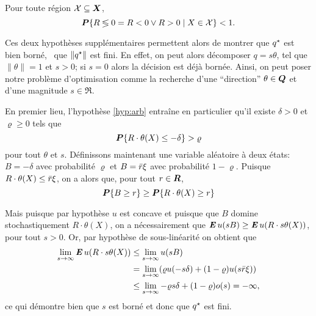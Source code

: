 \begin{assumption}
  \label{hyp:arb}
  Pour toute région $\mathcal{X}\subseteq\bm{X}$,
  \begin{equation}
    \bm P\{R \lessgtr 0 = R < 0 \vee R > 0 \mid X \in \mathcal{X}\} < 1.
  \end{equation}
\end{assumption}

Ces deux hypothèses supplémentaires permettent alors de montrer que $q^\star$ est bien borné,
\ie\ que $\|q^\star\|$ est fini. En effet, on peut alors décomposer $q = s\theta$, tel que
$\|\theta\|=1$ et $s>0$; si $s=0$ alors la décision est déjà bornée. Ainsi, on peut poser notre
problème d'optimisation comme la recherche d'une ``direction'' $\theta \in \bm Q$ et d'une magnitude
$s \in \Re$.

En premier lieu, l'hypothèse \ref{hyp:arb} entraîne en particulier qu'il existe
$\delta > 0$ et $\varrho \geq 0$ tels que
\begin{equation}
  \bm P\{R\cdot\theta(X) \leq -\delta\} > \varrho
\end{equation}
pour tout $\theta$ et $s$.  Définissons maintenant une variable aléatoire à
deux états: $B = -\delta$ avec probabilité $\varrho$ et $B = \bar r\xi$ avec probabilité
$1-\varrho$. Puisque $R\cdot \theta(X) \leq \bar r\xi$, on a alors que, pour tout $r \in \bm{R}$,
\begin{equation}
  \bm P\{B\geq r\} \geq \bm P\{R\cdot \theta(X)\geq r\}
\end{equation}

Mais puisque par hypothèse $u$ est concave et puisque que $B$ domine stochastiquement
$R\cdot \theta(X)$, on a nécessairement que $\operatorname{\mbox{\textbf{\textit{E}}}} u(sB) \geq \operatorname{\mbox{\textbf{\textit{E}}}} u(R\cdot s\theta(X))$, pour tout
$s > 0$. Or, par hypothèse de sous-linéarité on obtient que
\begin{align}
  \lim_{s\to\infty}\operatorname{\mbox{\textbf{\textit{E}}}} u(R\cdot s\theta(X)) &\leq \lim_{s\to\infty}u(sB)\\
                           & = \lim_{s\to\infty}(\varrho u(-s\delta) + (1-\varrho)u(s\bar r\xi))\\
                           & \leq\lim_{s\to\infty}-\varrho s \delta + (1-\varrho)o(s) = -\infty,
\end{align}
ce qui démontre bien que $s$ est borné et donc que $q^\star$ est fini.

